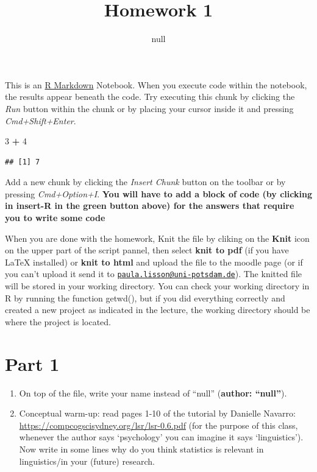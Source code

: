 \documentclass[]{article}
\title{Homework 1}
\author{null}
\date{}
\newenvironment{Shaded}{\begin{snugshade}}{\end{snugshade}}
\newcommand{\DecValTok}[1]{\textcolor[rgb]{0.00,0.00,0.81}{#1}}
\newcommand{\StringTok}[1]{\textcolor[rgb]{0.31,0.60,0.02}{#1}}
\newcommand{\OperatorTok}[1]{\textcolor[rgb]{0.81,0.36,0.00}{\textbf{#1}}}
\providecommand{\tightlist}{%
  \setlength{\itemsep}{0pt}\setlength{\parskip}{0pt}}
\begin{document}
\maketitle

This is an \href{http://rmarkdown.rstudio.com}{R Markdown} Notebook.
When you execute code within the notebook, the results appear beneath
the code. Try executing this chunk by clicking the \emph{Run} button
within the chunk or by placing your cursor inside it and pressing
\emph{Cmd+Shift+Enter}.

\begin{Shaded}
\begin{Highlighting}[]
\DecValTok{3} \OperatorTok{+}\StringTok{ }\DecValTok{4}
\end{Highlighting}
\end{Shaded}

\begin{verbatim}
## [1] 7
\end{verbatim}

Add a new chunk by clicking the \emph{Insert Chunk} button on the
toolbar or by pressing \emph{Cmd+Option+I}. \textbf{You will have to add
a block of code (by clicking in insert-R in the green button above) for
the answers that require you to write some code}

When you are done with the homework, Knit the file by cliking on the
\textbf{Knit} icon on the upper part of the script pannel, then select
\textbf{knit to pdf} (if you have LaTeX installed) or \textbf{knit to
html} and upload the file to the moodle page (or if you can't upload it
send it to
\href{mailto:paula.lisson@uni-potsdam.de}{\nolinkurl{paula.lisson@uni-potsdam.de}}).
The knitted file will be stored in your working directory. You can check
your working directory in R by running the function getwd(), but if you
did everything correctly and created a new project as indicated in the
lecture, the working directory should be where the project is located.

\section{Part 1}\label{part-1}

\begin{enumerate}
\def\labelenumi{\arabic{enumi}.}
\tightlist
\item
  On top of the file, write your name instead of ``null''
  (\textbf{author: ``null''}).
\item
  Conceptual warm-up: read pages 1-10 of the tutorial by Danielle
  Navarro: \url{https://compcogscisydney.org/lsr/lsr-0.6.pdf} (for the
  purpose of this class, whenever the author says `psychology' you can
  imagine it says `linguistics'). Now write in some lines why do you
  think statistics is relevant in linguistics/in your (future) research.
\end{enumerate}
\end{document}
